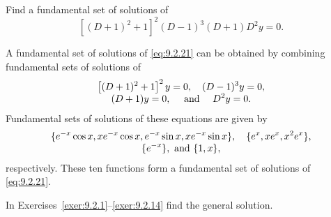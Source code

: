 \begin{example}
  \label{example:9.2.8} \rm Find a fundamental set of solutions of
  \begin{equation}
    \label{eq:9.2.21}[(D+1)^{2}+1]^{2}(D-1)^{3}(D+1)D^{2}y=0.
  \end{equation}
\end{example}

\begin{examplesolution}
\solution A fundamental set of solutions of \eqref{eq:9.2.21} can be obtained by combining
fundamental sets of solutions of
\[
  \begin{array}{c}
    \displaystyle\left[(D+1)^{2}+1\right]^{2}y=0,\quad(D-1)^{3}y=0, \\
    \displaystyle(D+1)y=0,\quad\mbox{ and }\quad D^{2}y=0.
  \end{array}
\]
Fundamental sets of solutions of these equations are given by
\[
  \begin{array}{c}
    \displaystyle\{e^{-x}\cos x,xe^{-x}\cos x,e^{-x}\sin x,xe^{-x}\sin x\},\quad\{e^{x},xe^{x},x^{2}e^{x}\}, \\
    \displaystyle\{e^{-x}\},\mbox{ and }\{1,x\},
  \end{array}
\]
respectively. These ten functions form a fundamental set of solutions of \eqref{eq:9.2.21}.
\end{examplesolution}

\exercises In Exercises~\ref{exer:9.2.1}--\ref{exer:9.2.14} find the general solution.

